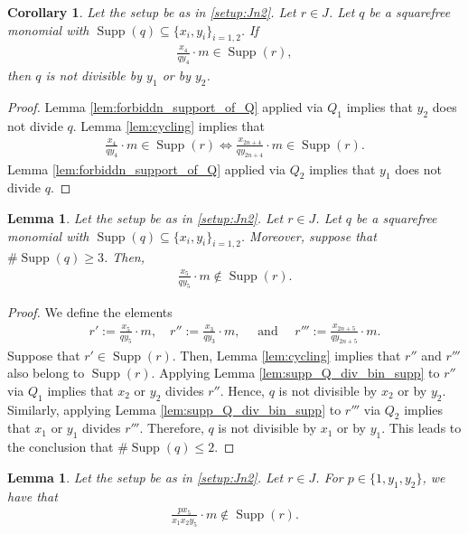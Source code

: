 \documentclass[12pt,a4paper]{amsart}
\theoremstyle{plain}
\newtheorem{cor}[thrm]{Corollary}
\def\bcor{\begin{cor}}
\def\ecor{\end{cor}}
\newtheorem{lem}[thrm]{Lemma}
\def\blem{\begin{lem}}
\def\elem{\end{lem}}
\theoremstyle{definition}
\def\bproof{\begin{proof}}
\def\eproof{\end{proof}}
\theoremstyle{remark}
\DeclareMathOperator{\Supp}{Supp}
\renewcommand{\subset}{\subseteq}
\begin{document}
\bcor
\label{cor:Jn2_structure_or_r'}
Let the setup be as in \ref{setup:Jn2}. Let $r \in J$. Let $q$ be a squarefree monomial with $\Supp(q) \subset \{x_{i},y_{i}\}_{i=1,2}$. If
\begin{align*}
    \frac{x_{4}}{qy_{4}}\cdot m \in \Supp(r),
\end{align*}
then $q$ is not divisible by $y_{1}$ or by $y_{2}$.
\ecor 

\bproof
Lemma \ref{lem:forbiddn_support_of_Q} applied via $Q_{1}$ implies that $y_{2}$ does not divide $q$. Lemma \ref{lem:cycling} implies that 
\begin{align*}
    \frac{x_{4}}{qy_{4}}\cdot m \in \Supp(r) \iff \frac{x_{2n+4}}{qy_{2n+4}}\cdot m \in \Supp(r).
\end{align*}
Lemma \ref{lem:forbiddn_support_of_Q} applied via $Q_{2}$ implies that $y_{1}$ does not divide $q$.
\eproof

\blem
\label{lem:Jn2_restriction_r'}
Let the setup be as in \ref{setup:Jn2}. Let $r \in J$. Let $q$ be a squarefree monomial with $\Supp(q) \subset \{x_{i}, y_{i}\}_{i=1,2}$. Moreover, suppose that $\#\Supp(q) \geq 3$. Then, 
\begin{align*}
\frac{x_{5}}{qy_{5}} \cdot m \notin \Supp(r).
\end{align*}
\elem 

\bproof
We define the elements 
\begin{align*}
    r' := \frac{x_{5}}{qy_{5}} \cdot m, \quad r'' := \frac{x_{3}}{qy_{3}} \cdot m, \quad \text{ and } \quad r''' := \frac{x_{2n+5}}{qy_{2n+5}} \cdot m.
\end{align*}
Suppose that $r' \in \Supp(r)$. Then, Lemma \ref{lem:cycling} implies that $r''$ and $r'''$ also belong to $\Supp(r)$. Applying Lemma \ref{lem:supp_Q_div_bin_supp} to $r''$ via $Q_{1}$ implies that $x_{2}$ or $y_{2}$ divides $r''$. Hence, $q$ is not divisible by $x_{2}$ or by $y_{2}$. Similarly, applying Lemma \ref{lem:supp_Q_div_bin_supp} to $r'''$ via $Q_{2}$ implies that $x_{1}$ or $y_{1}$ divides $r'''$. Therefore, $q$ is not divisible by $x_{1}$ or by $y_{1}$. This leads to the conclusion that $\# \Supp(q) \leq 2$.
\eproof 

\blem
\label{lem:Jn2_restriction_r'_numerator}
Let the setup be as in \ref{setup:Jn2}. Let $r \in J$. For $p \in \{1,y_{1},y_{2}\}$, we have that 
\begin{align*}
\frac{p x_{5}}{x_{1}x_{2}y_{5}} \cdot m \notin \Supp(r).
\end{align*}
\elem 
\end{document}
